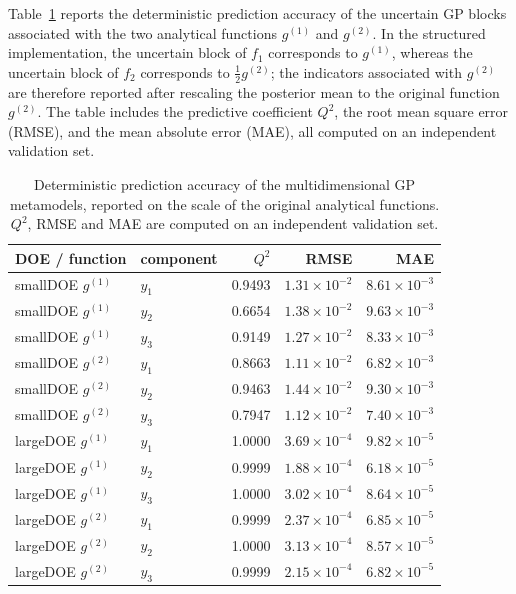 Table~\ref{tab:surrogate_quality_3d} reports the deterministic prediction accuracy of the uncertain GP blocks associated with the two analytical functions $g^{(1)}$ and $g^{(2)}$. In the structured implementation, the uncertain block of $f_1$ corresponds to $g^{(1)}$, whereas the uncertain block of $f_2$ corresponds to $\tfrac12 g^{(2)}$; the indicators associated with $g^{(2)}$ are therefore reported after rescaling the posterior mean to the original function $g^{(2)}$. The table includes the predictive coefficient $Q^2$, the root mean square error (RMSE), and the mean absolute error (MAE), all computed on an independent validation set.

\begin{table}[ht!]\centering
\caption{Deterministic prediction accuracy of the multidimensional GP metamodels, reported on the scale of the original analytical functions. $Q^2$, RMSE and MAE are computed on an independent validation set.}
\label{tab:surrogate_quality_3d}
\begin{tabular}{llrrr}
\hline
DOE / function & component & $Q^2$ & RMSE & MAE \\
\hline
smallDOE $g^{(1)}$ & $y_1$ & 0.9493 & $1.31\times10^{-2}$ & $8.61\times10^{-3}$ \\
smallDOE $g^{(1)}$ & $y_2$ & 0.6654 & $1.38\times10^{-2}$ & $9.63\times10^{-3}$ \\
smallDOE $g^{(1)}$ & $y_3$ & 0.9149 & $1.27\times10^{-2}$ & $8.33\times10^{-3}$ \\
smallDOE $g^{(2)}$ & $y_1$ & 0.8663 & $1.11\times10^{-2}$ & $6.82\times10^{-3}$ \\
smallDOE $g^{(2)}$ & $y_2$ & 0.9463 & $1.44\times10^{-2}$ & $9.30\times10^{-3}$ \\
smallDOE $g^{(2)}$ & $y_3$ & 0.7947 & $1.12\times10^{-2}$ & $7.40\times10^{-3}$ \\
largeDOE $g^{(1)}$ & $y_1$ & 1.0000 & $3.69\times10^{-4}$ & $9.82\times10^{-5}$ \\
largeDOE $g^{(1)}$ & $y_2$ & 0.9999 & $1.88\times10^{-4}$ & $6.18\times10^{-5}$ \\
largeDOE $g^{(1)}$ & $y_3$ & 1.0000 & $3.02\times10^{-4}$ & $8.64\times10^{-5}$ \\
largeDOE $g^{(2)}$ & $y_1$ & 0.9999 & $2.37\times10^{-4}$ & $6.85\times10^{-5}$ \\
largeDOE $g^{(2)}$ & $y_2$ & 1.0000 & $3.13\times10^{-4}$ & $8.57\times10^{-5}$ \\
largeDOE $g^{(2)}$ & $y_3$ & 0.9999 & $2.15\times10^{-4}$ & $6.82\times10^{-5}$ \\
\hline
\end{tabular}
\end{table}
